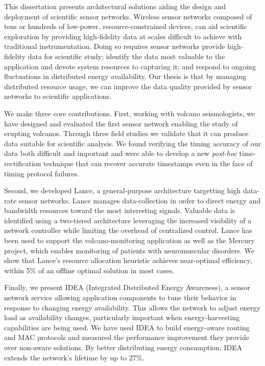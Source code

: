 \hspace{0.25in}

This dissertation presents architectural solutions aiding the design and
deployment of scientific sensor networks. Wireless sensor networks composed
of tens or hundreds of low-power, resource-constrained devices, can aid
scientific exploration by providing high-fidelity data at scales difficult to
achieve with traditional instrumentation. Doing so requires sensor networks
provide high-fidelity data for scientific study; identify the data most
valuable to the application and devote system resources to capturing it; and
respond to ongoing fluctuations in distributed energy availability. Our
thesis is that by managing distributed resource usage, we can improve the
data quality provided by sensor networks to scientific applications.

We make three core contributions. First, working with volcano seismologists,
we have designed and evaluated the first sensor network enabling the study of
erupting volcanos. Through three field studies we validate that it can
produce data suitable for scientific analysis. We found verifying the timing
accuracy of our data both difficult and important and were able to develop a
new \textit{post-hoc} time-rectification technique that can recover accurate
timestamps even in the face of timing protocol failures.

Second, we developed Lance, a general-purpose architecture targetting high
data-rate sensor networks. Lance manages data-collection in order to direct
energy and bandwidth resources toward the most interesting signals. Valuable
data is identified using a two-tiered architecture leveraging the increased
visibility of a network controller while limiting the overhead of centralized
control. Lance has been used to support the volcano-monitoring application as
well as the Mercury project, which enables monitoring of patients with
neuromuscular disorders. We show that Lance's resource allocation heuristic
achieves near-optimal efficiency, within 5\% of an offline optimal solution
in most cases.

Finally, we present IDEA (Integrated Distributed Energy Awareness), a sensor
network service allowing application components to tune their behavior in
response to changing energy availability. This allows the network to adjust
energy load as availability changes, particularly important when
energy-harvesting capabilities are being used. We have used IDEA to build
energy-aware routing and MAC protocols and measured the performance
improvement they provide over non-aware solutions. By better distributing
energy consumption, IDEA extends the network's lifetime by up to 27\%.
